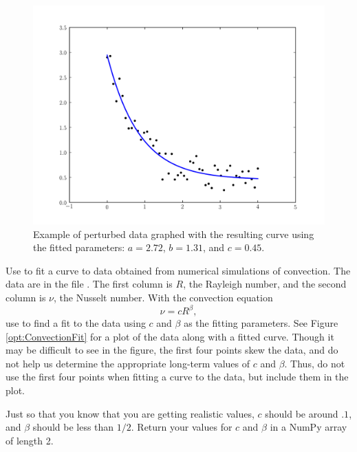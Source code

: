 \begin{figure}
\includegraphics[width=\textwidth]{curve_fit.pdf}
\caption{Example of perturbed data graphed with the resulting curve using the fitted parameters: $a=2.72$,  $b=1.31$, and $c=0.45$.}
\label{opt:curve_fit}
\end{figure}

\begin{problem} %
Use  to fit a curve to data obtained from numerical simulations of convection.
The data are in the file . 
The first column is $R$, the Rayleigh number, and the second column is $\nu$, the Nusselt number.
With the convection equation 
\[
\nu = cR^\beta,
\]
use  to find a fit to the data using $c$ and $\beta$ as the fitting parameters. 
See Figure \ref{opt:ConvectionFit} for a plot of the data along with a fitted curve.
Though it may be difficult to see in the figure, the first four points skew the data, and do not help us determine the appropriate long-term values of $c$ and $\beta$. 
Thus, do not use the first four points when fitting a curve to the data, but include them in the plot.

Just so that you know that you are getting realistic values, $c$ should be around $.1$, and $\beta$ should be less than $1/2$.
Return your values for $c$ and $\beta$ in a NumPy array of length 2.
\end{problem}

